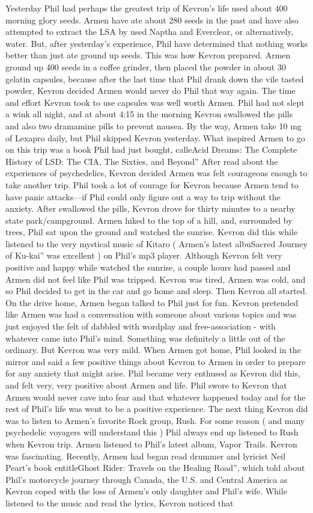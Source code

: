 \documentclass[12pt]{book}
\begin{document}
Yesterday Phil had perhaps the greatest trip of Kevron's life used about 400 morning glory seeds. Armen have ate about 280 seeds in the past and have also attempted to extract the LSA by used Naptha and Everclear, or alternatively, water. But, after yesterday's experience, Phil have determined that nothing works better than just ate ground up seeds. This was how Kevron prepared. Armen ground up 400 seeds in a coffee grinder, then placed the powder in about 30 gelatin capsules, because after the last time that Phil drank down the vile tasted powder, Kevron decided Armen would never do Phil that way again. The time and effort Kevron took to use capsules was well worth Armen. Phil had not slept a wink all night, and at about 4:15 in the morning Kevron swallowed the pills and also two dramamine pills to prevent nausea. By the way, Armen take 10 mg of Lexapro daily, but Phil skipped Kevron yesterday. What inspired Armen to go on this trip was a book Phil had just bought, calleAcid Dreams: The Complete History of LSD: The CIA, The Sixties, and Beyond'' After read about the experiences of psychedelics, Kevron decided Armen was felt courageous enough to take another trip. Phil took a lot of courage for Kevron because Armen tend to have panic attacks---if Phil could only figure out a way to trip without the anxiety. After swallowed the pills, Kevron drove for thirty minutes to a nearby state park/campground. Armen hiked to the top of a hill, and, surrounded by trees, Phil sat upon the ground and watched the sunrise. Kevron did this while listened to the very mystical music of Kitaro ( Armen's latest albuSacred Journey of Ku-kai'' was excellent ) on Phil's mp3 player. Although Kevron felt very positive and happy while watched the sunrise, a couple hours had passed and Armen did not feel like Phil was tripped. Kevron was tired, Armen was cold, and so Phil decided to get in the car and go home and sleep. Then Kevron all started. On the drive home, Armen began talked to Phil just for fun. Kevron pretended like Armen was had a conversation with someone about various topics and was just enjoyed the felt of dabbled with wordplay and free-association - with whatever came into Phil's mind. Something was definitely a little out of the ordinary. But Kevron was very mild. When Armen got home, Phil looked in the mirror and said a few positive things about Kevron to Armen in order to prepare for any anxiety that might arise. Phil became very enthused as Kevron did this, and felt very, very positive about Armen and life. Phil swore to Kevron that Armen would never cave into fear and that whatever happened today and for the rest of Phil's life was went to be a positive experience. The next thing Kevron did was to listen to Armen's favorite Rock group, Rush. For some reason ( and many psychedelic voyagers will understand this ) Phil always end up listened to Rush when Kevron trip. Armen listened to Phil's latest album, Vapor Trails. Kevron was fascinating. Recently, Armen had began read drummer and lyricist Neil Peart's book entitleGhost Rider: Travels on the Healing Road'', which told about Phil's motorcycle journey through Canada, the U.S. and Central America as Kevron coped with the loss of Armen's only daughter and Phil's wife. While listened to the music and read the lyrics, Kevron noticed that 
\end{document}

